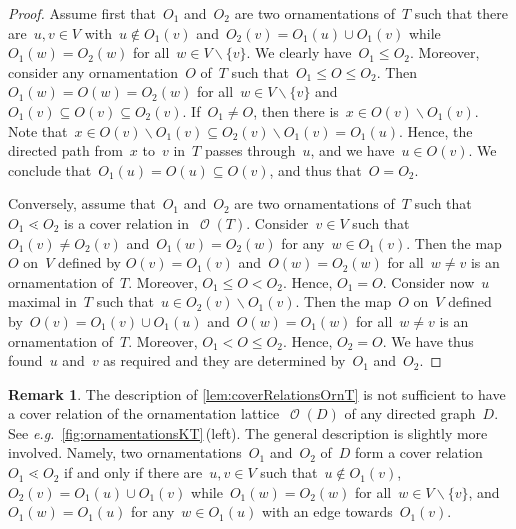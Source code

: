 \documentclass{amsart}
\theoremstyle{definition}
\newtheorem{remark}[theorem]{Remark}
\renewcommand{\c}[1]{\mathcal{#1}} %
\newcommand{\ssm}{\smallsetminus} %
\newcommand{\eg}{\textit{e.g.}~} %
\DeclareMathOperator{\Orn}{\c{O}}  %
\begin{document}
\begin{proof}
Assume first that~$O_1$ and~$O_2$ are two ornamentations of~$T$ such that there are~$u, v \in V$ with~$u \notin O_1(v)$ and~$O_2(v) = O_1(u) \cup O_1(v)$ while~$O_1(w) = O_2(w)$ for all~${w \in V \ssm \{v\}}$.
We clearly have~$O_1 \le O_2$.
Moreover, consider any ornamentation~$O$ of~$T$ such that~$O_1 \le O \le O_2$.
Then~$O_1(w) = O(w) = O_2(w)$ for all~${w \in V \ssm \{v\}}$ and~$O_1(v) \subseteq O(v) \subseteq O_2(v)$.
If~$O_1 \ne O$, then there is~$x \in O(v) \ssm O_1(v)$.
Note that~$x \in O(v) \ssm O_1(v) \subseteq O_2(v) \ssm  O_1(v) = O_1(u)$.
Hence, the directed path from~$x$ to~$v$ in~$T$ passes through~$u$, and we have~$u \in O(v)$.
We conclude that~$O_1(u) = O(u) \subseteq O(v)$, and thus that~$O = O_2$.

Conversely, assume that~$O_1$ and~$O_2$ are two ornamentations of~$T$ such that~$O_1 \lessdot O_2$ is a cover relation in~$\Orn(T)$.
Consider~$v \in V$ such that~$O_1(v) \ne O_2(v)$ and~$O_1(w) = O_2(w)$ for any~$w \in O_1(v)$.
Then the map~$O$ on~$V$ defined by $O(v) = O_1(v)$ and~$O(w) = O_2(w)$ for all~$w \ne v$ is an ornamentation of~$T$. %
Moreover, $O_1 \le O < O_2$.
Hence, $O_1 = O$.
Consider now~$u$ maximal in~$T$ such that~$u \in O_2(v) \ssm O_1(v)$.
Then the map~$O$ on~$V$ defined by~$O(v) = O_1(v) \cup O_1(u)$ and~$O(w) = O_1(w)$ for all~$w \ne v$ is an ornamentation of~$T$.
Moreover, $O_1 < O \le O_2$.
Hence, $O_2 = O$.
We have thus found~$u$ and~$v$ as required and they are determined by~$O_1$ and~$O_2$.
\end{proof}

\begin{remark}
\label{rem:coverRelationsOrn}
The description of \cref{lem:coverRelationsOrnT} is not sufficient to have a cover relation of the ornamentation lattice~$\Orn(D)$ of any directed graph~$D$.
See \eg \cref{fig:ornamentationsKT}\,(left).
The general description is slightly more involved.
Namely, two ornamentations~$O_1$ and~$O_2$ of~$D$ form a cover relation~$O_1 \lessdot O_2$ if and only if there are~$u, v \in V$ such that~$u \notin O_1(v)$, $O_2(v) = O_1(u) \cup O_1(v)$ while~$O_1(w) = O_2(w)$ for all~${w \in V \ssm \{v\}}$, and~$O_1(w) = O_1(u)$ for any~$w \in O_1(u)$ with an edge towards~$O_1(v)$.
\end{remark}
\end{document}
